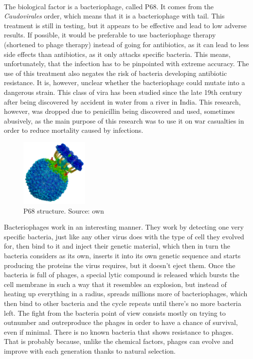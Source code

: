 \paragraph{}The biological factor is a bacteriophage, called P68. It comes from the \emph{Caudovirales} order, which means that it is a bacteriophage with tail.  This treatment is still in testing, but it appears to be effective and lead to low adverse results. If possible, it would be preferable to use bacteriophage therapy (shortened to phage therapy) instead of going for antibiotics, as it can lead to less side effects than antibiotics, as it only attacks specific bacteria. This means, unfortunately, that the infection has to be pinpointed with extreme accuracy. The use of this treatment also negates the risk of bacteria developing antibiotic resistance. It is, however, unclear whether the bacteriophage could mutate into a dangerous strain. This class of vira has been studied since the late 19th century after being discovered by accident in water from a river in India. This research, however, was dropped due to penicillin being discovered and used, sometimes abusively, as the main purpose of this research was to use it on war casualties in order to reduce mortality caused by infections\cite{zhouReviewNanosystemsEffective2018}.
\newpage{}\begin{figure}\begin{center}\includegraphics[width=0.30\textwidth]{assets/staph_side.png}\end{center}\caption{P68 structure. Source: own}\end{figure}Bacteriophages work in an interesting manner. They work by detecting one very specific bacteria, just like any other virus does with the type of cell they evolved for, then bind to it and inject their genetic material, which then in turn the bacteria considers as its own, inserts it into its own genetic sequence and starts producing the proteins the virus requires, but it doesn't eject them. Once the bacteria is full of phages, a special lytic compound is released which bursts the cell membrane in such a way that it resembles an explosion, but instead of heating up everything in a radius, spreads millions more of bacteriophages, which then bind to other bacteria and the cycle repeats until there's no more bacteria left. The fight from the bacteria point of view consists mostly on trying to outnumber and outreproduce the phages in order to have a chance of survival, even if minimal. There is no known bacteria that shows resistance to phages. That is probably because, unlike the chemical factors, phages can evolve and improve with each generation thanks to natural selection\cite{hrebikStructureGenomeEjection2019a}.
